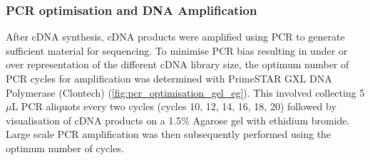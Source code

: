 \subsubsection{PCR optimisation and DNA Amplification}\label{ch: pcr_optimisation}
After cDNA synthesis, cDNA products were amplified using PCR to generate sufficient material for sequencing. To minimise PCR bias resulting in under or over representation of the different cDNA library size, the optimum number of PCR cycles for amplification was determined with PrimeSTAR GXL DNA Polymerase (Clontech) (\cref{fig:pcr_optimisation_gel_eg}). This involved collecting 5$\mu$L PCR aliquots every two cycles (cycles 10, 12, 14, 16, 18, 20) followed by visualisation of cDNA products on a 1.5\% Agarose gel with ethidium bromide. Large scale PCR amplification was then subsequently performed using the optimum number of cycles.  

